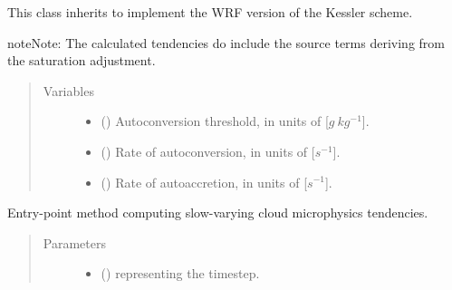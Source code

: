 \documentclass[letterpaper,10pt,english]{sphinxmanual}
\begin{document}
\begin{fulllineitems}
\label{\detokenize{api:parameterizations.slow_tendency_microphysics_kessler_wrf_saturation.SlowTendencyMicrophysicsKesslerWRFSaturation}}
This class inherits 
to implement the WRF version of the Kessler scheme.

\begin{sphinxadmonition}{note}{Note:}
The calculated tendencies do include the source terms deriving from the saturation adjustment.
\end{sphinxadmonition}
\begin{quote}\begin{description}
\item[{Variables}] \leavevmode\begin{itemize}
\item {} 
 () \textendash{} Autoconversion threshold, in units of {[}\(g ~ kg^{-1}\){]}.

\item {} 
 () \textendash{} Rate of autoconversion, in units of {[}\(s^{-1}\){]}.

\item {} 
 () \textendash{} Rate of autoaccretion, in units of {[}\(s^{-1}\){]}.

\end{itemize}

\end{description}\end{quote}

\begin{fulllineitems}
\label{\detokenize{api:parameterizations.slow_tendency_microphysics_kessler_wrf_saturation.SlowTendencyMicrophysicsKesslerWRFSaturation.__call__}}
Entry-point method computing slow-varying cloud microphysics tendencies.
\begin{quote}\begin{description}
\item[{Parameters}] \leavevmode\begin{itemize}
\item {} 
 () \textendash{}  representing the timestep.


\end{itemize}
\end{description}
\end{quote}
\end{fulllineitems}
\end{fulllineitems}
\end{document}
